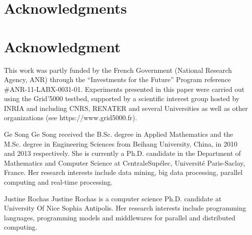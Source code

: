 \documentclass[10pt,journal,compsoc]{IEEEtran}
\begin{document}
  \section*{Acknowledgments}
\else
  \section*{Acknowledgment}
\fi
This work was partly funded by the French Government (National Research Agency, ANR) through the “Investments for the 
Future” Program reference \#ANR-11-LABX-0031-01. Experiments presented in this paper were carried out using the 
Grid'5000 testbed, supported by a scientific interest group hosted by INRIA and including CNRS, RENATER and several 
Universities as well as other organizations (see https://www.grid5000.fr).
\ifCLASSOPTIONcaptionsoff
  \newpage
\fi






\begin{IEEEbiography}
{Ge Song}
Ge Song received the B.Sc. degree in Applied Mathematics and the M.Sc. degree in Engineering Sciences from Beihang University, China, in 2010 and 2013 respectively. She is currently a Ph.D. candidate in the Department of Mathematics and Computer Science at  CentraleSup\'elec, Universit\'e Paris-Saclay, France. Her research interests include data mining, big data processing, parallel computing and real-time processing.
\end{IEEEbiography}

\begin{IEEEbiography}
{Justine Rochas}
Justine Rochas is a computer science Ph.D. candidate at University Of Nice Sophia Antipolis. Her research interests include programming languages, programming models and middlewares for parallel and distributed computing.
\end{IEEEbiography}
\end{document}
